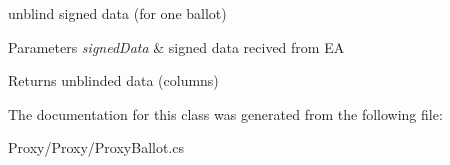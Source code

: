 unblind signed data (for one ballot) 


\begin{DoxyParams}{Parameters}
{\em signed\+Data} & signed data recived from E\+A\\
\hline
\end{DoxyParams}
\begin{DoxyReturn}{Returns}
unblinded data (columns)
\end{DoxyReturn}


The documentation for this class was generated from the following file\+:\begin{DoxyCompactItemize}
\item 
Proxy/\+Proxy/Proxy\+Ballot.\+cs\end{DoxyCompactItemize}
